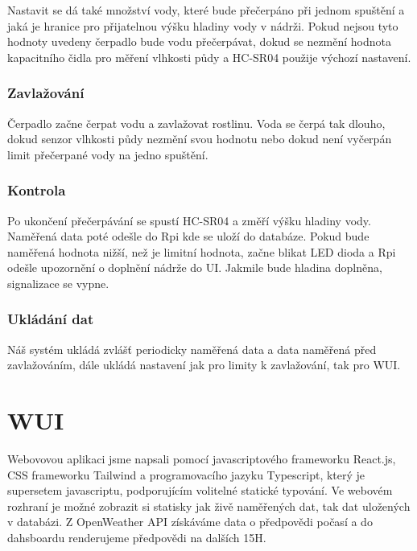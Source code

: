 \documentclass[12pt,a4paper]{article}
\begin{document}
Nastavit se dá také množství vody, které bude přečerpáno při jednom spuštění a
jaká je hranice pro přijatelnou výšku hladiny vody v nádrži. Pokud nejsou tyto
hodnoty uvedeny čerpadlo bude vodu přečerpávat, dokud se nezmění hodnota
kapacitního čidla pro měření vlhkosti půdy a HC-SR04 použije výchozí nastavení.

\subsubsection{Zavlažování}

Čerpadlo začne čerpat vodu a zavlažovat rostlinu. Voda se čerpá tak dlouho,
dokud senzor vlhkosti půdy nezmění svou hodnotu nebo dokud není vyčerpán limit
přečerpané vody na jedno spuštění.

\subsubsection{Kontrola}

Po ukončení přečerpávání se spustí HC-SR04 a změří výšku hladiny vody. Naměřená
data poté odešle do Rpi kde se uloží do databáze. Pokud bude naměřená hodnota
nižší, než je limitní hodnota, začne blikat LED dioda a Rpi odešle upozornění o
doplnění nádrže do UI. Jakmile bude hladina doplněna, signalizace se vypne.

\subsubsection{Ukládání dat}

Náš systém ukládá zvlášť periodicky naměřená data a data naměřená před
zavlažováním, dále ukládá nastavení jak pro limity k zavlažování, tak pro
\ac{WUI}.

\section{WUI}

Webovovou aplikaci jsme napsali pomocí javascriptového frameworku
React.js, CSS frameworku
Tailwind a programovacího jazyku Typescript, který je supersetem javascriptu,
podporujícím volitelné statické typování. Ve webovém rozhraní je možné zobrazit
si statisky jak živě
naměřených dat, tak dat uložených v databázi. Z OpenWeather API získáváme data
o předpovědi počasí a do dahsboardu renderujeme předpovědi na dalších 15H.
\end{document}
